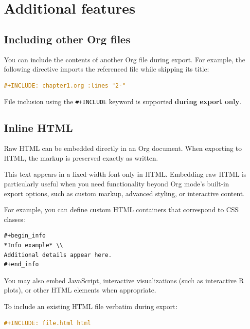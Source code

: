 \documentclass{mcreport}
\begin{document}
\section{Additional features}
\label{sec:orgc02fb54}

\subsection{Including other Org files}
\label{sec:orge5ab6b4}

You can include the contents of another Org file during export. For example, the
following directive imports the referenced file while skipping its title:

\begin{lstlisting}[language=org,numbers=none]
#+INCLUDE: chapter1.org :lines "2-"
\end{lstlisting}

\begin{note}
File inclusion using the \lstinline|#+INCLUDE| keyword is supported \textbf{during export only}.
\end{note}
\subsection{Inline HTML}
\label{sec:org84942de}

Raw HTML can be embedded directly in an Org document. When exporting to HTML,
the markup is preserved exactly as written.

This text appears in a fixed-width font only in HTML.
Embedding raw HTML is particularly useful when you need functionality beyond Org
mode's built-in export options, such as custom markup, advanced styling, or
interactive content.

For example, you can define custom HTML containers that correspond to CSS
classes:

\begin{verbatim}
#+begin_info
*Info example* \\
Additional details appear here.
#+end_info
\end{verbatim}

You may also embed JavaScript, interactive visualizations (such as interactive
R plots), or other HTML elements when appropriate.

To include an existing HTML file verbatim during export:

\begin{lstlisting}[language=org,numbers=none]
#+INCLUDE: file.html html
\end{lstlisting}
\end{document}
